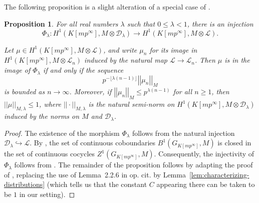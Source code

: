 \documentclass{amsart}
\numberwithin{equation}{section}
\newtheorem{proposition}[theorem]{Proposition}
\newcommand{\Zp}{\mathbb{Z}_p}
\newcommand{\cH}{\mathcal{H}}
\newcommand{\cD}{\mathcal{D}}
\newcommand{\sL}{\mathscr{L}}
\begin{document}





The following proposition is a slight alteration of a special case of \cite[Proposition~2.3.2]{LZ1}.

\begin{proposition}\label{prop:inject-H1}
    For all real numbers $\lambda$ such that $0\le \lambda<1$, there is an injection $$\Phi_\lambda:H^1(K[mp^\infty],M\otimes \cD_{\lambda})\longrightarrow H^1(K[mp^\infty],M\otimes \sL).$$
    
    Let $\mu\in H^1(K[mp^\infty],M\otimes \sL)$, and write $\mu_n$ for its image in $H^1(K[mp^\infty],M\otimes \sL_n)$ induced by the natural map $\sL\rightarrow\sL_n$. Then $\mu$ is in the image of $\Phi_\lambda$ if and only if the sequence
    \[
    p^{-\lfloor \lambda (n-1)\rfloor}\left|\left|\mu_n\right|\right|_M
    \]
    is bounded as $n\rightarrow\infty$. Moreover, if $\left|\left|\mu_n\right|\right|_M\le p^{ \lambda (n-1)}$ for all $n\ge1$, then $||\mu||_{M,\lambda}\le 1$,
    where $||\cdot||_{M,\lambda}$ is the natural semi-norm on $H^1(K[mp^\infty],M\otimes\cD_{\lambda})$ induced by the norms on $M$ and $\cD_{\lambda}$.
\end{proposition}
\begin{proof}
The existence of the morphism $\Phi_\lambda$ follows from the natural injection $\cD_{\lambda}\hookrightarrow\sL$.
By \cite[Proposition~2.1.2]{LZ1}, the set of continuous coboundaries $B^1(G_{K[mp^\infty]},M)$ is closed in the set of continuous cocycles $Z^1(G_{K[mp^\infty]},M)$. Consequently, the injectivity of $\Phi_\lambda$ follows from \cite[proof of Proposition~II.2.1]{colmez98}. The remainder of the proposition follows by adapting the proof of \cite[Proposition~2.3.2]{LZ1}, replacing the use of Lemma~2.2.6 in op. cit. by Lemma~\ref{lem:characterizing-distributions} (which tells us that the constant $C$ appearing there can be taken to be $1$ in our setting). 
\end{proof}
\end{document}

